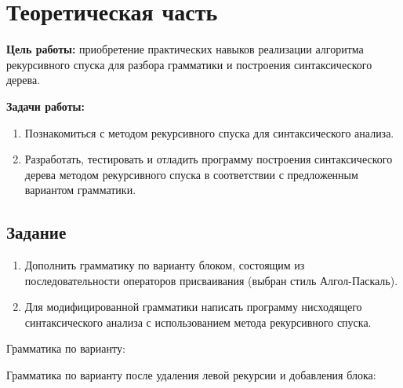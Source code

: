 \chapter{Теоретическая часть}

\textbf{Цель работы:} приобретение практических навыков реализации алгоритма рекурсивного спуска для разбора грамматики и построения синтаксического дерева.

\textbf{Задачи работы:}

\begin{enumerate}
	\item Познакомиться с методом рекурсивного спуска для синтаксического анализа.
	\item Разработать, тестировать и отладить программу построения синтаксического дерева методом рекурсивного спуска в соответствии с предложенным вариантом грамматики.
\end{enumerate}

\section{Задание}

\begin{enumerate}
	\item Дополнить грамматику по варианту блоком, состоящим из последовательности операторов присваивания (выбран стиль Алгол-Паскаль).
	\item Для модифицированной грамматики написать программу нисходящего синтаксического анализа с использованием метода рекурсивного спуска.
\end{enumerate}

Грамматика по варианту:


Грамматика по варианту после удаления левой рекурсии и добавления блока:



